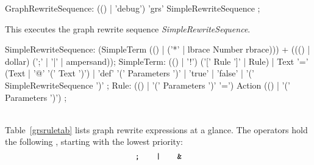 \makeatletter
\begin{rail}
  GraphRewriteSequence: (() | 'debug') 'grs' SimpleRewriteSequence ;
\end{rail}
This executes the graph rewrite sequence \emph{SimpleRewriteSequence}.
\begin{rail}
  SimpleRewriteSequence: (SimpleTerm (() | ('*' | lbrace Number rbrace))) + ((() | dollar) (';' | '|' | ampersand));
  SimpleTerm: (() | '!') ('[' Rule ']' | Rule) |
    Text '=' (Text | '@' '(' Text ')') |
    'def' '(' Parameters ')' |
    'true' |
    'false' |
    '(' SimpleRewriteSequence ')' ;
  Rule: (() | '(' Parameters ')' '=') Action (() | '(' Parameters ')') ;
\end{rail}
\makeatother
\mbox{\quad}\\
Table~\ref{grsruletab} lists graph rewrite expressions at a glance. The operators hold the following , starting with the lowest priority: 
\[ \text{\texttt{;}} \;\;\;\;\;\;\; \text{\texttt{|}} \;\;\;\;\;\;\;  \text{\texttt{\&}}\] 

